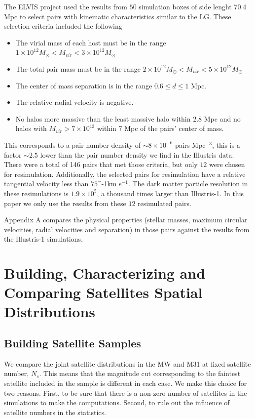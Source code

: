 \documentclass[a4paper,fleqn,usenatbib]{mnras}
\newcommand{\kms}{\ifmmode\mathrm{km\ s}^{-1}\else km s$^{-1}$\fi}
\begin{document}
The ELVIS project used the results from $50$ simulation boxes of side
lenght $70.4$ Mpc to select pairs with kinematic characteristics
similar to the LG. 
These selection criteria included the following
\begin{itemize}
\item The virial mass of each host must be in the range 
$1\times
  10^{12} M_{\odot}< M_{vir}<3\times 10^{12}M_{\odot}$ 
\item The total pair mass must be in the range
$2\times
  10^{12} M_{\odot}< M_{vir}<5\times 10^{12}M_{\odot}$ 
\item The center of mass separation is in the range $0.6\leq d\leq1$
  Mpc.
\item The relative radial velocity is negative.
\item No halos more massive than the least massive halo within $2.8$
  Mpc and no halos with $M_{vir}>7\times 10^{13}$ within $7$ Mpc of
  the pairs' center of mass.
\end{itemize} 

This corresponds to a pair number density of $\sim 8 \times10^{-6}$ pairs
Mpc$^{-3}$, this is a factor $\sim 2.5$ lower than the pair number density
we find in the Illustris data.
There were a total of 146 pairs that met those criteria, but only $12$
were chosen for resimulation. 
Additionally, the selected pairs for resimulation have a relative
tangential velocity less than $75 $\kms. 
The dark matter particle resolution in these resimulations is
$1.9\times 10^5$, a thousand times larger than Illustris-1.
In this paper we only use the results from these $12$ resimulated pairs.

Appendix A compares the physical properties (stellar masses, maximum
circular velocities, radial velocities and separation) in those
pairs against the results from the Illustris-1 simulations.

\section{Building, Characterizing and Comparing Satellites Spatial Distributions}
\label{sec:SpatialMeasurements}


\subsection{Building Satellite Samples}

We compare the joint satellite distributions in the MW and M31 at fixed
satellite number, $N_s$.
This means that the magnitude cut corresponding to the faintest
satellite included in the sample is different in each case.
We make this choice for two reasons. 
First, to be sure that there is a non-zero number of satellites in the
simulations to make the computations.  
Second, to rule out the influence of satellite numbers in the
statistics. 
\end{document}
